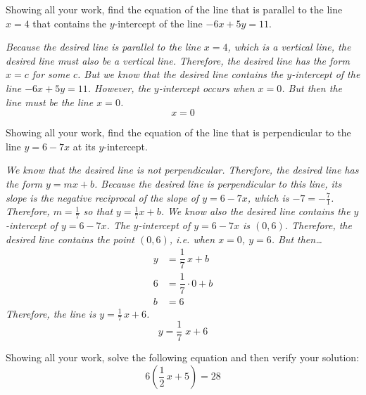 \documentclass[12pt,letterpaper]{exam}
\begin{document}
\begin{questions}
\newpage
\question[10] Showing all your work, find the equation of the line that is parallel to the line $x= 4$ that contains the $y$-intercept of the line $-6x + 5y= 11$. \pspace

{\noindent \itshape Because the desired line is parallel to the line $x= 4$, which is a vertical line, the desired line must also be a vertical line. Therefore, the desired line has the form $x= c$ for some $c$. But we know that the desired line contains the $y$-intercept of the line $-6x + 5y= 11$. However, the $y$-intercept occurs when $x= 0$. But then the line must be the line $x= 0$.
	\[
	\boxed{x= 0}
	\]
}



\newpage
\question[10] Showing all your work, find the equation of the line that is perpendicular to the line $y= 6 - 7x$ at its $y$-intercept. \pspace

{\noindent \itshape We know that the desired line is not perpendicular. Therefore, the desired line has the form $y= mx + b$. Because the desired line is perpendicular to this line, its slope is the negative reciprocal of the slope of $y= 6 - 7x$, which is $-7= -\frac{7}{1}$. Therefore, $m= \frac{1}{7}$ so that $y= \frac{1}{7}x + b$. We know also the desired line contains the $y$-intercept of $y= 6 - 7x$. The $y$-intercept of $y= 6 - 7x$ is $(0, 6)$. Therefore, the desired line contains the point $(0, 6)$, i.e. when $x= 0$, $y= 6$. But then\dots
	\[
	\begin{aligned}
	y&= \dfrac{1}{7}\,x + b \\[0.3cm]
	6&= \dfrac{1}{7} \cdot 0 + b \\[0.3cm]
	b&= 6
	\end{aligned}
	\]
Therefore, the line is $y= \frac{1}{7}\,x + 6$. \pspace
	\[
	\boxed{y= \dfrac{1}{7}\;x + 6}
	\]
}



\newpage
\question[10] Showing all your work, solve the following equation and then verify your solution:
	\[
	6 \left( \dfrac{1}{2}\,x + 5 \right)= 28
	\] \pvspace{1.5cm}


\end{questions}
\end{document}
